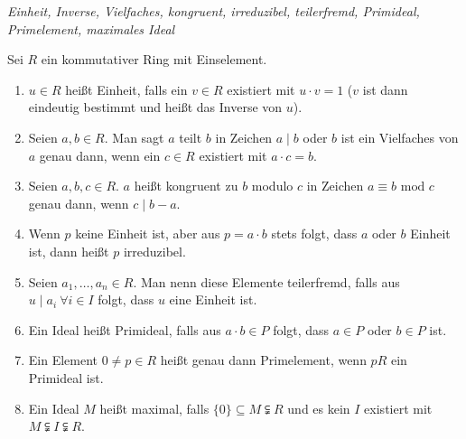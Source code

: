 \begin{mydef}\textit{Einheit, Inverse, Vielfaches, kongruent, irreduzibel, teilerfremd, Primideal, Primelement, maximales Ideal}\medskip

    Sei $R$ ein kommutativer Ring mit Einselement.
    \begin{enumerate}
        \item $u \in R$ heißt Einheit, falls ein $v \in R$ existiert mit $u \cdot v = 1$ ($v$ ist dann eindeutig bestimmt und heißt das Inverse von $u$).
        \item Seien $a, b \in R$. Man sagt $a$ teilt $b$ in Zeichen $a \mid b$ oder $b$ ist ein Vielfaches von $a$ genau dann, wenn ein $c \in R$ existiert mit $a \cdot c = b$.
        \item Seien $a, b, c \in R$. $a$ heißt kongruent zu $b$ modulo $c$ in Zeichen $a \equiv b \mbox{ mod }c$ genau dann, wenn $c \mid b-a$.
        \item Wenn $p$ keine Einheit ist, aber aus $p = a \cdot b$ stets folgt, dass $a$ oder $b$ Einheit ist, dann heißt $p$ irreduzibel.
        \item Seien $a_1, \ldots ,a_n \in R$. Man nenn diese Elemente teilerfremd, falls aus $u \mid a_i \ \forall i \in I$ folgt, dass $u$ eine Einheit ist.
        \item Ein Ideal heißt Primideal, falls aus $a \cdot b \in P$ folgt, dass $a \in P$ oder $b \in P$ ist.
        \item Ein Element $0 \neq p \in R$ heißt genau dann Primelement, wenn $pR$ ein Primideal ist.
        \item Ein Ideal $M$ heißt maximal, falls $\{ 0 \}\subseteq M \subsetneqq R$ und es kein $I$ existiert mit $M \subsetneqq I \subsetneqq R$.
    \end{enumerate}
\end{mydef}


